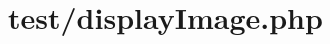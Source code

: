 \hypertarget{test_2display_image_8php-example}{
\section{test/display\-Image.\-php}
}

\begin{DoxyCodeInclude}
\end{DoxyCodeInclude}
 